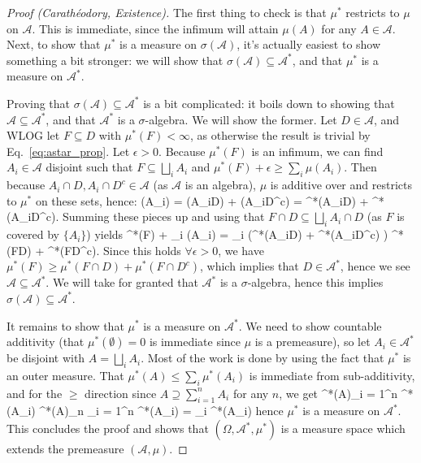 \begin{proof}[Proof (Carath\'eodory, Existence)]
	The first thing to check is that $\mu^*$ restricts to $\mu$ on $\mathcal A$. This is immediate, since the infimum will attain $\mu(A)$ for any $A\in\mathcal A$. Next, to show that $\mu^*$ is a measure on $\sigma(\mathcal A)$, it's actually easiest to show something a bit stronger: we will show that $\sigma(\mathcal A)\subseteq\mathcal A^*$, and that $\mu^*$ is a measure on $\mathcal A^*$. 
	
	Proving that $\sigma(\mathcal A)\subseteq\mathcal A^*$ is a bit complicated: it boils down to showing that $\mathcal A\subseteq\mathcal A^*$, and that $\mathcal A^*$ is a $\sigma$-algebra. We will show the former. Let $D\in\mathcal A$, and WLOG let $F\subseteq D$ with $\mu^*(F) < \infty$, as otherwise the result is trivial by Eq.~\eqref{eq:astar_prop}. Let $\epsilon > 0$. Because $\mu^*(F)$ is an infimum, we can find $A_i\in\mathcal A$ disjoint such that $F\subseteq\bigsqcup_i A_i$ and $\mu^*(F) + \epsilon\geq \sum_i \mu(A_i)$. Then because $A_i\cap D, A_i\cap D^c\in\mathcal A$ (as $\mathcal A$ is an algebra), $\mu$ is additive  over and restricts to $\mu^*$ on these sets, hence:
	\eq
		\mu(A_i) = \mu(A_i\cap D) + \mu(A_i\cap D^c) = \mu^*(A_i\cap D) + \mu^*(A_i\cap D^c).
	\qe
	Summing these pieces up and using that $F\cap D\subseteq\bigsqcup_i A_i\cap D$ (as $F$ is covered by $\{A_i\}$) yields
	\eq
		\mu^*(F) + \epsilon \geq \sum_i \mu(A_i) = \sum_i \left(\mu^*(A_i\cap D) + \mu^*(A_i\cap D^c) \right) \geq \mu^*(F\cap D) + \mu^*(F\cap D^c).
	\qe
	Since this holds $\forall\epsilon > 0$, we have $\mu^*(F)\geq \mu^*(F\cap D) + \mu^*(F\cap D^c)$, which implies that $D\in\mathcal A^*$, hence we see $\mathcal A\subseteq\mathcal A^*$. We will take for granted that $\mathcal A^*$ is a $\sigma$-algebra, hence this implies $\sigma(\mathcal A)\subseteq\mathcal A^*$. 
	
	It remains to show that $\mu^*$ is a measure on $\mathcal A^*$. We need to show countable additivity (that $\mu^*(\emptyset) = 0$ is immediate since $\mu$ is a premeasure), so let $A_i\in\mathcal A^*$ be disjoint with $A = \bigsqcup_i A_i$. Most of the work is done by using the fact that $\mu^*$ is an outer measure. That $\mu^*(A)\leq \sum_i \mu^*(A_i)$ is immediate from sub-additivity, and for the $\geq$ direction since $A\supseteq\sum_{i = 1}^n A_i$ for any $n$, we get
	\eq
		\mu^*(A)\geq \sum_{i = 1}^n \mu^*(A_i) \implies \mu^*(A)\geq \lim_{n\rightarrow\infty} \sum_{i = 1}^n \mu^*(A_i) = \sum_i \mu^*(A_i)
	\qe
	hence $\mu^*$ is a measure on $\mathcal A^*$. This concludes the proof and shows that $(\Omega, \mathcal A^*, \mu^*)$ is a measure space which extends the premeasure $(\mathcal A, \mu)$. 
	
\end{proof}

